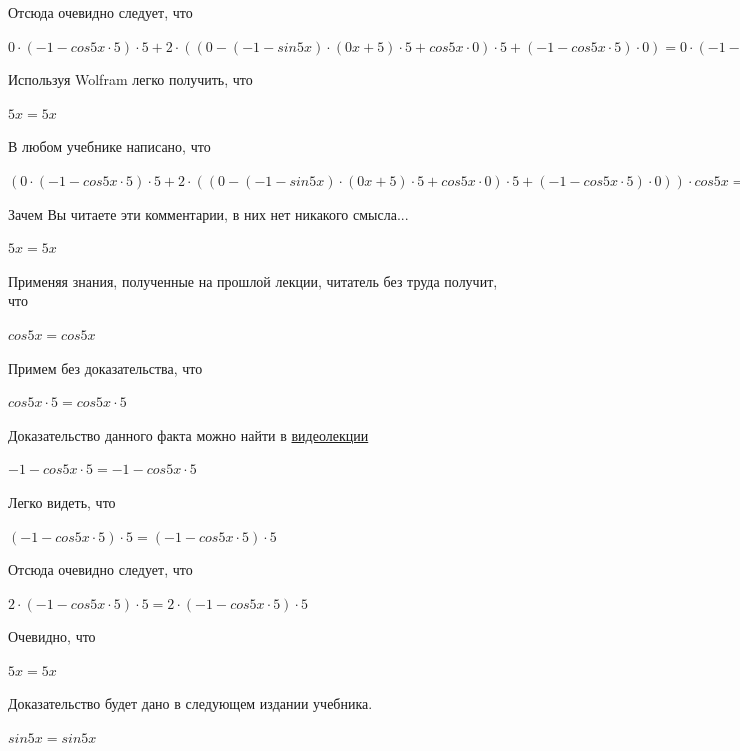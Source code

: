 \documentclass[12pt,a4paper,fleqn]{article}
\theoremstyle{definition}
\begin{document}
Отсюда очевидно следует, что 

$ 0  \cdot ( -1  - cos 5  x  \cdot  5 ) \cdot  5  +  2  \cdot (( 0  - ( -1  - sin 5  x ) \cdot ( 0  x  +  5 ) \cdot  5  + cos 5  x  \cdot  0 ) \cdot  5  + ( -1  - cos 5  x  \cdot  5 ) \cdot  0 ) =  0  \cdot ( -1  - cos 5  x  \cdot  5 ) \cdot  5  +  2  \cdot (( 0  - ( -1  - sin 5  x ) \cdot ( 0  x  +  5 ) \cdot  5  + cos 5  x  \cdot  0 ) \cdot  5  + ( -1  - cos 5  x  \cdot  5 ) \cdot  0 )$

Используя Wolfram легко получить, что 

$ 5  x  =  5  x $

В любом учебнике написано, что 

$( 0  \cdot ( -1  - cos 5  x  \cdot  5 ) \cdot  5  +  2  \cdot (( 0  - ( -1  - sin 5  x ) \cdot ( 0  x  +  5 ) \cdot  5  + cos 5  x  \cdot  0 ) \cdot  5  + ( -1  - cos 5  x  \cdot  5 ) \cdot  0 )) \cdot cos 5  x  = ( 0  \cdot ( -1  - cos 5  x  \cdot  5 ) \cdot  5  +  2  \cdot (( 0  - ( -1  - sin 5  x ) \cdot ( 0  x  +  5 ) \cdot  5  + cos 5  x  \cdot  0 ) \cdot  5  + ( -1  - cos 5  x  \cdot  5 ) \cdot  0 )) \cdot cos 5  x $

Зачем Вы читаете эти комментарии, в них нет никакого смысла... 

$ 5  x  =  5  x $

Применяя знания, полученные на прошлой лекции, читатель без труда получит, что 

$cos 5  x  = cos 5  x $

Примем без доказательства, что 

$cos 5  x  \cdot  5  = cos 5  x  \cdot  5 $

Доказательство данного факта можно найти в \href{https://www.youtube.com/watch?v=dQw4w9WgXcQ}{видеолекции} 

$ -1  - cos 5  x  \cdot  5  =  -1  - cos 5  x  \cdot  5 $

Легко видеть, что 

$( -1  - cos 5  x  \cdot  5 ) \cdot  5  = ( -1  - cos 5  x  \cdot  5 ) \cdot  5 $

Отсюда очевидно следует, что 

$ 2  \cdot ( -1  - cos 5  x  \cdot  5 ) \cdot  5  =  2  \cdot ( -1  - cos 5  x  \cdot  5 ) \cdot  5 $

Очевидно, что 

$ 5  x  =  5  x $

Доказательство будет дано в следующем издании учебника. 

$sin 5  x  = sin 5  x $
\end{document}
